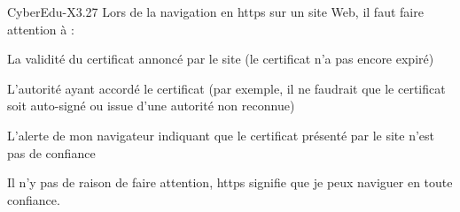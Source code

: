 \begin{multi}[multiple=true]{CyberEdu-X3.27}
	Lors de la navigation en https sur un site Web, il faut faire attention à :
\item* La validité du certificat annoncé par le site (le certificat n'a pas encore expiré)
\item* L'autorité ayant accordé le certificat (par exemple, il ne faudrait que le certificat soit auto-signé ou issue d'une autorité non reconnue)
\item* L'alerte de mon navigateur indiquant que le certificat présenté par le site n'est pas de confiance
\item Il n'y pas de raison de faire attention,  https  signifie que je peux naviguer en toute confiance.
\end{multi}



